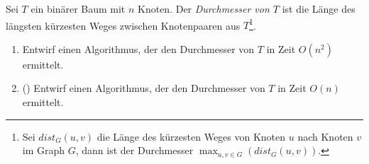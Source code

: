 \documentclass{uebung_cs}
\begin{document}
\begin{aufgabe}
	Sei $T$ ein binärer Baum mit $n$ Knoten.
	Der \textit{Durchmesser von $T$} ist die Länge des längsten kürzesten Weges zwischen Knotenpaaren aus $T$\footnote{Sei $dist_G(u,v)$ die Länge des kürzesten Weges von Knoten $u$ nach Knoten $v$ im Graph $G$, dann ist der Durchmesser $\max_{u,v\in G}( dist_G(u,v) )$.}.
	\begin{enumerate}
		\item Entwirf einen Algorithmus, der den Durchmesser von $T$ in Zeit $O(n^2)$ ermittelt.
		\item (\veryhard) Entwirf einen Algorithmus, der den Durchmesser von $T$ in Zeit $O(n)$ ermittelt.
	\end{enumerate}
\end{aufgabe}
\end{document}
